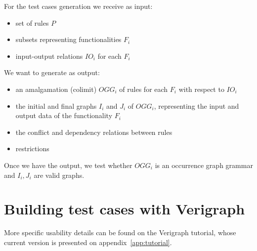 \begin{example}\label{ex:inout}
\end{example}

For the test cases generation we receive as input:

\begin{itemize}
\item set of rules $P$
\item subsets representing functionalities $F_i$
\item input-output relations $IO_i$ for each $F_i$
\end{itemize}

We want to generate as output:

\begin{itemize}
\item an amalgamation (colimit) $OGG_i$ of rules for each $F_i$ with respect to $IO_i$
\item the initial and final graphs $I_i$ and $J_i$ of $OGG_i$, representing the input and output data of the functionality $F_i$
\item the conflict and dependency relations between rules 
\item restrictions 
\end{itemize}

\begin{example}
\end{example}

\begin{example}
\end{example}

Once we have the output, we test whether $OGG_i$ is an occurrence graph grammar and $I_i, J_i$ are valid graphs.

\begin{example}[]
\end{example}

\section{Building test cases with Verigraph}

More specific usability details can be found on the Verigraph tutorial, whose current version is presented on appendix~\ref{app:tutorial}.
